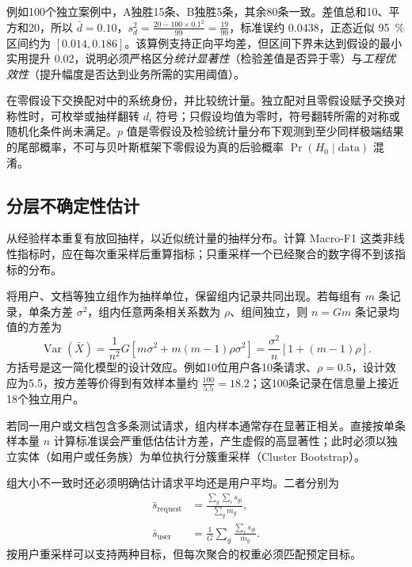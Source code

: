 \documentclass[../textbook.tex]{subfiles}
\begin{document}
例如100个独立案例中，A独胜15条、B独胜5条，其余80条一致。差值总和10、平方和20，所以 $\bar d=0.10$，$s_d^2=\frac{20-100\times0.1^2}{99}=\frac{19}{99}$，标准误约 0.0438，正态近似 \qty{95}{\percent} 区间约为 $[0.014,0.186]$。该算例支持正向平均差，但区间下界未达到假设的最小实用提升 0.02，说明必须严格区分\emph{统计显著性}（检验差值是否异于零）与\emph{工程优效性}（提升幅度是否达到业务所需的实用阈值）。

在零假设下交换配对中的系统身份，并比较统计量。独立配对且零假设赋予交换对称性时，可枚举或抽样翻转 $d_i$ 符号；只假设均值为零时，符号翻转所需的对称或随机化条件尚未满足。$p$ 值是零假设及检验统计量分布下观测到至少同样极端结果的尾部概率，不可与贝叶斯框架下零假设为真的后验概率 $\Pr(H_0\mid \text{data})$ 混淆。

\subsection{分层不确定性估计}
从经验样本重复有放回抽样，以近似统计量的抽样分布\cite{efron1979bootstrap}。计算 Macro-F1 这类非线性指标时，应在每次重采样后重算指标；只重采样一个已经聚合的数字得不到该指标的分布。

将用户、文档等独立组作为抽样单位，保留组内记录共同出现。若每组有 $m$ 条记录，单条方差 $\sigma^2$，组内任意两条相关系数为 $\rho$、组间独立，则 $n=Gm$ 条记录均值的方差为
\begin{equation}
 \operatorname{Var}(\bar X)=\frac{1}{n^2}G\left[m\sigma^2+m(m-1)\rho\sigma^2\right]
 =\frac{\sigma^2}{n}[1+(m-1)\rho].
 \label{eq:eval-cluster}
\end{equation}
方括号是这一简化模型的设计效应。例如10位用户各10条请求、$\rho=0.5$，设计效应为5.5，按方差等价得到有效样本量约 $\frac{100}{5.5}=18.2$；这100条记录在信息量上接近18个独立用户。

\begin{tip}[分组数据的有效样本量核算]
若同一用户或文档包含多条测试请求，组内样本通常存在显著正相关。直接按单条样本量 $n$ 计算标准误会严重低估估计方差，产生虚假的高显著性；此时必须以独立实体（如用户或任务族）为单位执行分簇重采样（Cluster Bootstrap）。
\end{tip}

组大小不一致时还必须明确估计请求平均还是用户平均。二者分别为
\begin{equation}
 \begin{aligned}
  \bar s_{\mathrm{request}} &= \frac{\sum_g\sum_i s_{gi}}{\sum_g m_g}, \\
  \bar s_{\mathrm{user}} &= \frac{1}{G}\sum_g\frac{\sum_i s_{gi}}{m_g}.
 \end{aligned}
\end{equation}
按用户重采样可以支持两种目标，但每次聚合的权重必须匹配预定目标。
\end{document}
